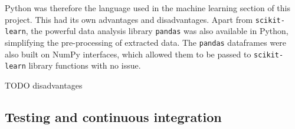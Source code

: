 \documentclass[Report.tex]{subfiles}
\begin{document}
Python was therefore the language used in the machine learning section of this project. This had its own advantages and disadvantages. Apart from \texttt{scikit-learn}, the powerful data analysis library \texttt{pandas} \cite{pandas} was also available in Python, simplifying the pre-processing of extracted data. The \texttt{pandas} dataframes were also built on NumPy interfaces, which allowed them to be passed to \texttt{scikit-learn} library functions with no issue. 

TODO disadvantages

\subsection{Testing and continuous integration}
\end{document}

